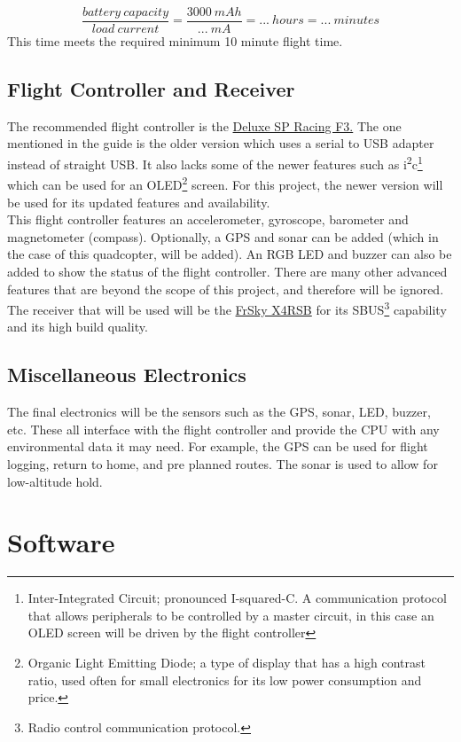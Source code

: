\documentclass[12pt]{article}
\begin{document}
\begin{equation} 
\frac{battery\ capacity}{load\ current} = \frac{3000\ mAh}{...\ mA} = ...\ hours = ...\ minutes
\end{equation}
This time meets the required minimum 10 minute flight time.

\subsection{Flight Controller and Receiver}
The recommended flight controller is the \href{https://www.banggood.com/Upgrade-NAZE32-F3-Flight-Controller-Acro-6-DOF-Deluxe-10-DOF-for-Multirotor-Racing-p-1010232.html?ID=17&cur_warehouse=CN}{\color{cyan}Deluxe SP Racing F3.} The one mentioned in the guide is the older version which uses a serial to USB adapter instead of straight USB. It also lacks some of the newer features such as i\textsuperscript{2}c\footnote{Inter-Integrated Circuit; pronounced I-squared-C. A communication protocol that allows peripherals to be controlled by a master circuit, in this case an OLED screen will be driven by the flight controller} which can be used for an OLED\footnote{Organic Light Emitting Diode; a type of display that has a high contrast ratio, used often for small electronics for its low power consumption and price.} screen. For this project, the newer version will be used for its updated features and availability.
\\

This flight controller features an accelerometer, gyroscope, barometer and magnetometer (compass). Optionally, a GPS and sonar can be added (which in the case of this quadcopter, will be added). An RGB LED and buzzer can also be added to show the status of the flight controller. There are many other advanced features that are beyond the scope of this project, and therefore will be ignored.
\\

The receiver that will be used will be the \href{https://hobbyking.com/en_us/frsky-x4rsb-3-16ch-2-4ghz-accst-receiver-w-telemetry.html}{\color{cyan}FrSky X4RSB} for its SBUS\footnote{Radio control communication protocol.} capability and its high build quality. 

\subsection{Miscellaneous Electronics}
The final electronics will be the sensors such as the GPS, sonar, LED, buzzer, etc. These all interface with the flight controller and provide the CPU with any environmental data it may need. For example, the GPS can be used for flight logging, return to home, and pre planned routes. The sonar is used to allow for low-altitude hold.

\section{Software}
\end{document}
